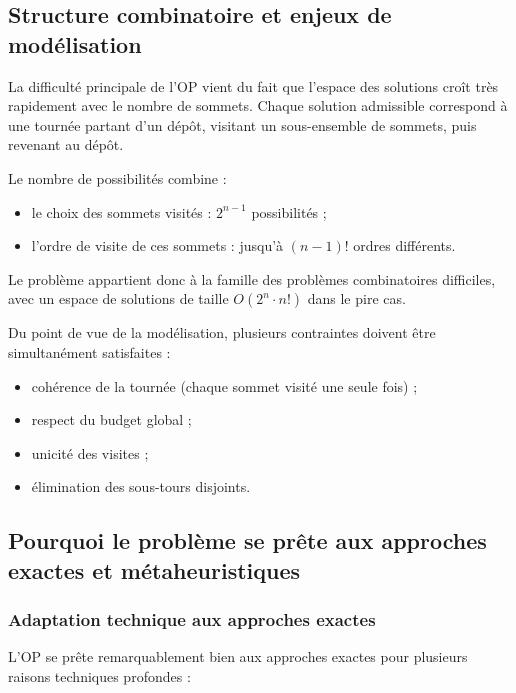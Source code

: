 \documentclass[11pt,a4paper]{article}
\begin{document}
\subsection{Structure combinatoire et enjeux de modélisation}

La difficulté principale de l'OP vient du fait que l'espace des solutions croît très rapidement avec le nombre de sommets. Chaque solution admissible correspond à une tournée partant d'un dépôt, visitant un sous-ensemble de sommets, puis revenant au dépôt.

Le nombre de possibilités combine :

\begin{itemize}
    \item le choix des sommets visités : $2^{n-1}$ possibilités ;
    \item l'ordre de visite de ces sommets : jusqu'à $(n-1)!$ ordres différents.
\end{itemize}

Le problème appartient donc à la famille des problèmes combinatoires difficiles, avec un espace de solutions de taille $O(2^n \cdot n!)$ dans le pire cas.

Du point de vue de la modélisation, plusieurs contraintes doivent être simultanément satisfaites :

\begin{itemize}
    \item cohérence de la tournée (chaque sommet visité une seule fois) ;
    \item respect du budget global ;
    \item unicité des visites ;
    \item élimination des sous-tours disjoints.
\end{itemize}

\subsection{Pourquoi le problème se prête aux approches exactes et métaheuristiques}

\subsubsection*{Adaptation technique aux approches exactes}

L'OP se prête remarquablement bien aux approches exactes pour plusieurs raisons techniques profondes :
\end{document}
